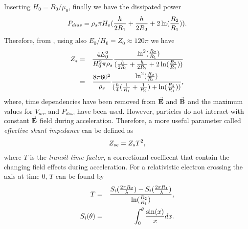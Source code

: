 \documentclass[a4paper,oneside,12pt]{report}
\numberwithin{equation}{chapter}
\begin{document}
Inserting $H_0=B_0/\mu_0$, finally we have the dissipated power
\vspace{-10pt}\begin{equation} \label{eq:p_diss}
    P_{diss} = \rho_s \pi H_o ( \frac{h}{2R_1} + \frac{h}{2R_2} + 2\ln(\frac{R_2}{R_1}) ).
\vspace{-10pt}\end{equation}
Therefore, from , using  also $E_0/H_0 = Z_0 \approx 120 \pi$ we have
\vspace{-10pt}\begin{eqnarray}
    Z_s &=& \frac{4E_0^2}{H_0^2 \pi \rho_s} \frac{ \ln^2(\frac{R_2}{R_1})}{(\frac{h}{2R_1} + \frac{h}{2R_2} + 2 \ln(\frac{R_2}{R_1}))} \nonumber\\
        &=& \frac{8 \pi 60^2}{\rho_s} \frac{ \ln^2(\frac{R_2}{R_1})}{(\frac{h}{4}(\frac{1}{R_1} + \frac{1}{R_2}) + \ln(\frac{R_2}{R_1}))}   ,
\vspace{-10pt}\end{eqnarray}
where, time dependencies have been removed from $\vec{\textbf{E}}$ and $\vec{\textbf{B}}$ 
and the maximum values for $V_{acc}$ and $P_{diss}$ have been used. 
However, particles do not interact with constant $\vec{\textbf{E}}$ field during acceleration. 
Therefore, a more useful parameter called \textit{effective shunt impedance} can be defined as
\vspace{-10pt}\begin{equation}
    Z_{se} = Z_s T^2  ,
\vspace{-10pt}\end{equation}
where $T$ is the \textit{transit time factor}, a correctional coefficent that contain the changing field effects during acceleration.
\clearpage
For a relativistic electron crossing the axis at time 0, $T$ can be found by \cite{rhodo_pottier}
\vspace{-10pt}\begin{eqnarray}
    T &=& \frac{S_i(\frac{2 \pi R_2}{\lambda}) - S_i(\frac{2 \pi R_1}{\lambda})}{\ln(\frac{R_2}{R_1})}   ,\\
    S_i(\theta) &=& \int_0^{\theta} \frac{\sin(x)}{x} dx .
\vspace{-10pt}\end{eqnarray}
\end{document}
